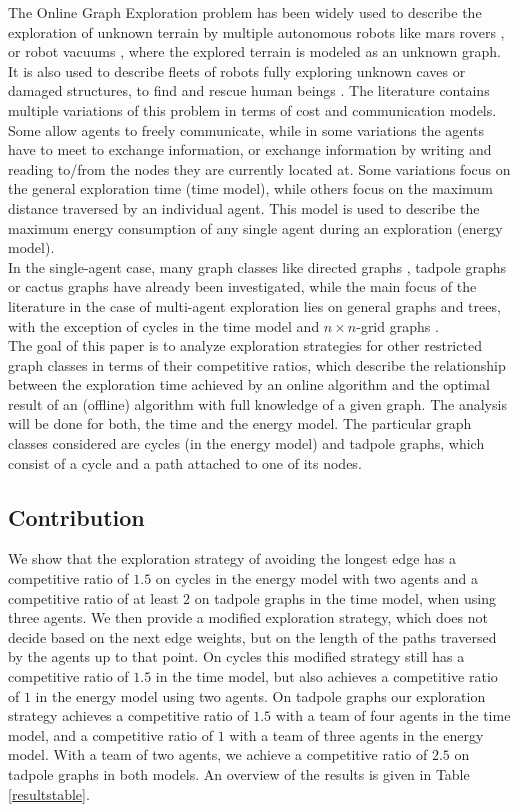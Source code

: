 The Online Graph Exploration problem has been widely used to describe the exploration of unknown terrain by multiple autonomous robots like mars rovers \cite{Dynia}, or robot vacuums \cite{Ortolf2012},
where the explored terrain is modeled as an unknown graph. It is also used to describe fleets of robots fully exploring unknown caves or damaged structures, to find and rescue human beings \cite{Higashikawa2012}. 
The literature contains multiple variations of this problem in terms of cost and communication models. Some allow agents to freely
communicate, while in some variations the agents have to meet to exchange information, or exchange information by writing and reading to/from the nodes they are currently located at. Some variations focus on the general exploration time (time model), while others 
focus on the maximum distance traversed by an individual agent. This model is used to describe the maximum energy consumption of any single agent during an exploration (energy model).\\
In the single-agent case, many graph classes like directed graphs \cite{Foerster2016}, tadpole graphs \cite{Brandt2020} or cactus graphs \cite{Fritsch2021} have already been investigated, 
while the main focus of the literature in the case of multi-agent exploration lies on general graphs and trees, with the exception of cycles in the time model \cite{Higashikawa2012} and $n\times n$-grid graphs \cite{Ortolf2012}.\\
The goal of this paper is to analyze exploration strategies for other restricted graph classes in terms of their competitive ratios, which describe the relationship between the exploration time
achieved by an online algorithm and the optimal result of an (offline) algorithm with full knowledge of a given graph. The analysis will be done for both, the time and the energy model. 
The particular graph classes considered are cycles (in the energy model) and tadpole graphs, which consist of a cycle and a path attached to one of its nodes.

\subsection{Contribution}

We show that the exploration strategy of avoiding the longest edge has a competitive ratio of $1.5$ on cycles in the energy model with two agents and a competitive ratio of at least $2$
on tadpole graphs in the time model, when using three agents. We then provide a modified exploration strategy, which does not decide based on the next edge weights, but on the length of the paths traversed
by the agents up to that point. On cycles this modified strategy still has a competitive ratio of $1.5$ in the time model, but also achieves a competitive ratio of $1$ in the energy model using two agents.
On tadpole graphs our exploration strategy achieves a competitive ratio of $1.5$ with a team of four agents in the time model, 
and a competitive ratio of $1$ with a team of three agents in the energy model. With a team of two agents, we achieve a competitive ratio
of $2.5$ on tadpole graphs in both models. An overview of the results is given in Table \ref{resultstable}.

